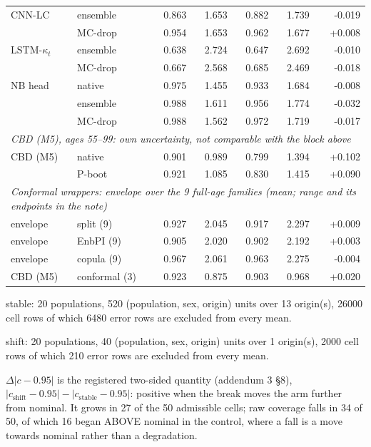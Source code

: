 \begin{table}[tbp]
\begin{threeparttable}
\begin{tabular}{@{}llrrrrr@{}}
CNN-LC & ensemble & 0.863 & 1.653 & 0.882 & 1.739 & -0.019 \\
 & MC-drop & 0.954 & 1.653 & 0.962 & 1.677 & +0.008 \\
LSTM-$\kappa_t$ & ensemble & 0.638 & 2.724 & 0.647 & 2.692 & -0.010 \\
 & MC-drop & 0.667 & 2.568 & 0.685 & 2.469 & -0.018 \\
NB head & native & 0.975 & 1.455 & 0.933 & 1.684 & -0.008 \\
 & ensemble & 0.988 & 1.611 & 0.956 & 1.774 & -0.032 \\
 & MC-drop & 0.988 & 1.562 & 0.972 & 1.719 & -0.017 \\
\multicolumn{7}{l}{\emph{CBD (M5), ages 55--99: own uncertainty, not comparable with the block above}} \\
\midrule
CBD (M5) & native & 0.901 & 0.989 & 0.799 & 1.394 & +0.102 \\
 & P-boot & 0.921 & 1.085 & 0.830 & 1.415 & +0.090 \\
\multicolumn{7}{l}{\emph{Conformal wrappers: envelope over the 9 full-age families (mean; range and its endpoints in the note)}} \\
\midrule
envelope & split (9) & 0.927 & 2.045 & 0.917 & 2.297 & +0.009 \\
envelope & EnbPI (9) & 0.905 & 2.020 & 0.902 & 2.192 & +0.003 \\
envelope & copula (9) & 0.967 & 2.061 & 0.963 & 2.275 & -0.004 \\
CBD (M5) & conformal (3) & 0.923 & 0.875 & 0.903 & 0.968 & +0.020 \\
\bottomrule
\end{tabular}
\begin{tablenotes}\scriptsize
\item stable: 20 populations, 520 (population, sex, origin) units over 13 origin(s), 26000 cell rows of which 6480 error rows are excluded from every mean.
\item shift: 20 populations, 40 (population, sex, origin) units over 1 origin(s), 2000 cell rows of which 210 error rows are excluded from every mean.
\item $\Delta|c-0.95|$ is the registered two-sided quantity (addendum 3 \S8), $|c_{\mathrm{shift}}-0.95| - |c_{\mathrm{stable}}-0.95|$: positive when the break moves the arm further from nominal. It grows in 27 of the 50 admissible cells; raw coverage falls in 34 of 50, of which 16 began ABOVE nominal in the control, where a fall is a move towards nominal rather than a degradation.

\end{tablenotes}
\end{threeparttable}
\end{table}
